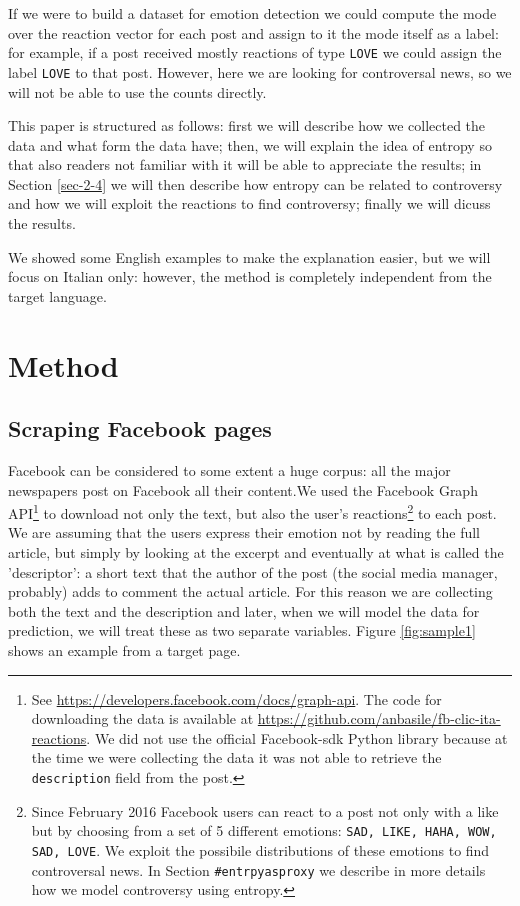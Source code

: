 \documentclass[article,11pt,nofixltx2e]{article}
\begin{document}
If we were to build a dataset for emotion detection we could compute the mode over the reaction vector for each post and assign to it the mode itself as a label: for example, if a post received mostly reactions of type \texttt{LOVE} we could assign the label \texttt{LOVE} to that post. However, here we are looking for controversal news, so we will not be able to use the counts directly.

This paper is structured as follows: first we will describe how we collected the data and what form the data have; then, we will explain the idea of entropy so that also readers not familiar with it will be able to appreciate the results; in Section \ref{sec-2-4} we will then describe how entropy can be related to controversy and how we will exploit the reactions to find controversy; finally we will dicuss the results.

We showed some English examples to make the explanation easier, but we will focus on Italian only: however, the method is completely independent from the target language.

\section{Method}
\label{sec-2}

\subsection{Scraping Facebook pages}
\label{sec-2-1}

Facebook can be considered to some extent a huge corpus: all the major newspapers post on Facebook all their content.We used the Facebook Graph API\footnote{See \url{https://developers.facebook.com/docs/graph-api}. The code for downloading the data is available at \url{https://github.com/anbasile/fb-clic-ita-reactions}. We did not use the official Facebook-sdk Python library because at the time we were collecting the data it was not able to retrieve the \texttt{description} field from the post.} to download not only the text, but also the user's reactions\footnote{Since February 2016 Facebook users can react to a post not only with a like but by choosing from a set of 5 different emotions: \texttt{SAD, LIKE, HAHA, WOW, SAD, LOVE}. We exploit the possibile distributions of these emotions to find controversal news. In Section \texttt{\#entrpyasproxy} we describe in more details how we model controversy using entropy.} to each post. We are assuming that the users express their emotion not by reading the full article, but simply by looking at the excerpt and eventually at what is called the 'descriptor': a short text that the author of the post (the social media manager, probably) adds to comment the actual article. For this reason we are collecting both the text and the description and later, when we will model the data for prediction, we will treat these as two separate variables. Figure \ref{fig:sample1} shows an example from a target page.
\end{document}
